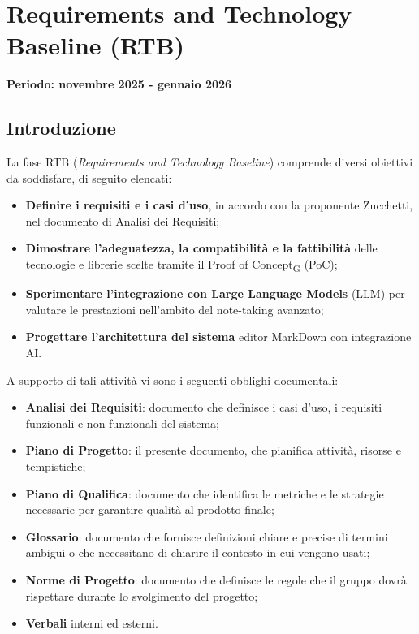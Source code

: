 \documentclass[11pt,a4paper]{article}
\begin{document}
\section{Requirements and Technology Baseline (RTB)}
\small\textbf{Periodo: novembre 2025 - gennaio 2026}

\subsection{Introduzione}
La fase RTB (\textit{Requirements and Technology Baseline}) comprende diversi obiettivi da soddisfare, di seguito elencati:

\begin{itemize}
    \item \textbf{Definire i requisiti e i casi d'uso}, in accordo con la proponente Zucchetti, nel documento di Analisi dei Requisiti;
    \item \textbf{Dimostrare l'adeguatezza, la compatibilità e la fattibilità} delle tecnologie e librerie scelte tramite il Proof of Concept\textsubscript{G} (PoC);
    \item \textbf{Sperimentare l'integrazione con Large Language Models} (LLM) per valutare le prestazioni nell'ambito del note-taking avanzato;
    \item \textbf{Progettare l'architettura del sistema} editor MarkDown con integrazione AI.
\end{itemize}

\noindent A supporto di tali attività vi sono i seguenti obblighi documentali:

\begin{itemize}
    \item \textbf{Analisi dei Requisiti}: documento che definisce i casi d'uso, i requisiti funzionali e non funzionali del sistema;
    \item \textbf{Piano di Progetto}: il presente documento, che pianifica attività, risorse e tempistiche;
    \item \textbf{Piano di Qualifica}: documento che identifica le metriche e le strategie necessarie per garantire qualità al prodotto finale;
    \item \textbf{Glossario}: documento che fornisce definizioni chiare e precise di termini ambigui o che necessitano di chiarire il contesto in cui vengono usati;
    \item \textbf{Norme di Progetto}: documento che definisce le regole che il gruppo dovrà rispettare durante lo svolgimento del progetto;
    \item \textbf{Verbali} interni ed esterni.
\end{itemize}
\end{document}
